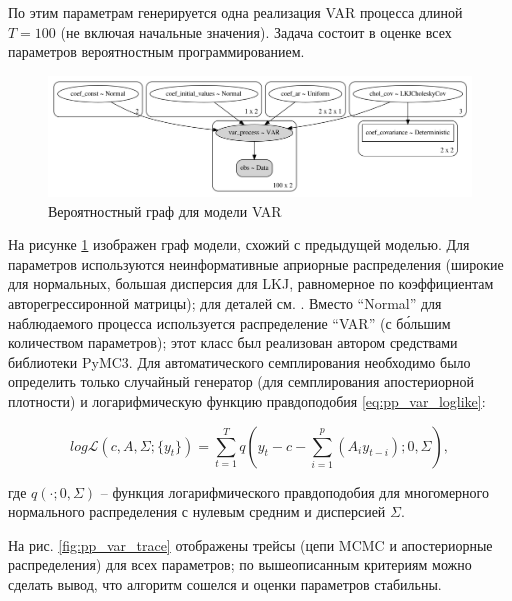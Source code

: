\documentclass[a4paper,14pt]{extreport}
\begin{document}
По этим параметрам генерируется одна реализация VAR процесса длиной $T=100$ (не включая начальные значения). Задача состоит в оценке всех параметров вероятностным программированием.

\begin{figure}[H]
	\includegraphics[width=\linewidth]{img/gen/pp_var_graph.png}
	\caption{Вероятностный граф для модели VAR}
	\label{fig:pp_var_graph}
\end{figure}

На рисунке \ref{fig:pp_var_graph} изображен граф модели, схожий с предыдущей моделью. Для параметров используются неинформативные априорные распределения (широкие для нормальных, большая дисперсия для LKJ, равномерное по коэффициентам авторегрессиронной матрицы); для деталей см. . Вместо ``Normal'' для наблюдаемого процесса используется распределение ``VAR'' (с б\'{о}льшим количеством параметров); этот класс был реализован автором средствами библиотеки PyMC3. Для автоматического семплирования необходимо было определить только случайный генератор (для семплирования апостериорной плотности) и логарифмическую функцию правдоподобия \eqref{eq:pp_var_loglike}:

\begin{equation}
	\mathit{log}\mathcal{L}(c, A, \Sigma; \{y_t\})
	=
	\sum\limits_{t=1}^{T}{
	q(y_t - c - \sum_{i=1}^{p}{(A_i y_{t-i})}; 0, \Sigma)
	} ,
	\label{eq:pp_var_loglike}
\end{equation}

\noindent
где $q(\cdot; 0, \Sigma)$ -- функция логарифмического правдоподобия для многомерного нормального распределения с нулевым средним и дисперсией $\Sigma$.

На рис. \ref{fig:pp_var_trace} отображены трейсы (цепи MCMC и апостериорные распределения) для всех параметров; по вышеописанным критериям \cite{stan_user_guide} можно сделать вывод, что алгоритм сошелся и оценки параметров стабильны.
\end{document}
